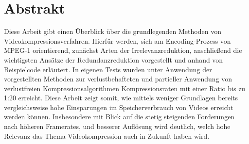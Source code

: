 \chapter{Abstrakt}
Diese Arbeit gibt einen Überblick über die grundlegenden Methoden von Videokompressionsverfahren. Hierfür werden, sich am Encoding-Prozess von MPEG-1 orientierend, zunächst Arten der Irrelevanzreduktion, anschließend die wichtigsten Ansätze der Redundanzreduktion vorgestellt und anhand von Beispielcode erläutert. In eigenen Tests wurden unter Anwendung der vorgestellten Methoden zur verlustbehafteten und partieller Anwendung von verlustfreien Kompressionsalgorithmen Kompressionsraten mit einer Ratio bis zu 1:20 erreicht. Diese Arbeit zeigt somit, wie mittels weniger Grundlagen bereits vergleichsweise hohe Einsparungen im Speicherverbrauch von Videos erreicht werden können. Insbesondere mit Blick auf die stetig steigenden Forderungen nach höheren Framerates, und besserer Auflösung wird deutlich, welch hohe Relevanz das Thema Videokompression auch in Zukunft haben wird.
